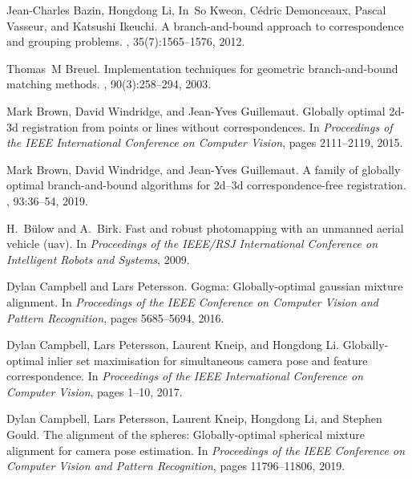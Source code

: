 \documentclass[letterpaper, 10 pt, conference]{ieeeconf}  %
\begin{document}

\begin{thebibliography}{10}

	Jean-Charles Bazin, Hongdong Li, In~So Kweon, C{\'e}dric Demonceaux, Pascal
	  Vasseur, and Katsushi Ikeuchi.
	\newblock A branch-and-bound approach to correspondence and grouping problems.
	,
	  35(7):1565--1576, 2012.
	
	Thomas~M Breuel.
	\newblock Implementation techniques for geometric branch-and-bound matching
	  methods.
	, 90(3):258--294, 2003.
	
	Mark Brown, David Windridge, and Jean-Yves Guillemaut.
	\newblock Globally optimal 2d-3d registration from points or lines without
	  correspondences.
	\newblock In {\em Proceedings of the IEEE International Conference on Computer
	  Vision}, pages 2111--2119, 2015.
	
	Mark Brown, David Windridge, and Jean-Yves Guillemaut.
	\newblock A family of globally optimal branch-and-bound algorithms for 2d--3d
	  correspondence-free registration.
	, 93:36--54, 2019.
	
	H.~B\"ulow and A.~Birk.
	\newblock Fast and robust photomapping with an unmanned aerial vehicle (uav).
	\newblock In {\em Proceedings of the IEEE/RSJ International Conference on
	  Intelligent Robots and Systems}, 2009.
	
	Dylan Campbell and Lars Petersson.
	\newblock Gogma: Globally-optimal gaussian mixture alignment.
	\newblock In {\em Proceedings of the IEEE Conference on Computer Vision and
	  Pattern Recognition}, pages 5685--5694, 2016.
	
	Dylan Campbell, Lars Petersson, Laurent Kneip, and Hongdong Li.
	\newblock Globally-optimal inlier set maximisation for simultaneous camera pose
	  and feature correspondence.
	\newblock In {\em Proceedings of the IEEE International Conference on Computer
	  Vision}, pages 1--10, 2017.
	
	Dylan Campbell, Lars Petersson, Laurent Kneip, Hongdong Li, and Stephen Gould.
	\newblock The alignment of the spheres: Globally-optimal spherical mixture
	  alignment for camera pose estimation.
	\newblock In {\em Proceedings of the IEEE Conference on Computer Vision and
	  Pattern Recognition}, pages 11796--11806, 2019.
	

\end{thebibliography}
\end{document}
